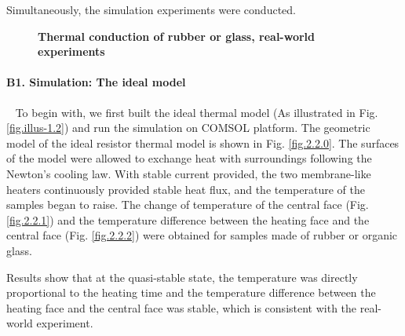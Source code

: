 \documentclass[10pt,a4paper,twocolumn,twoside,UTF8]{article}
\begin{document}
	Simultaneously, the simulation experiments were conducted.
	\begin{figure}[htbp]
		\centering
		\caption{\textbf{Thermal conduction of rubber or glass, real-world experiments}}
		\label{fig.2.1}
	\end{figure}


	\paragraph{B1. Simulation: The ideal model}~
	\newline 
	\indent
	To begin with, we first built the ideal thermal model (As illustrated in Fig. \ref{fig.illus-1.2}) and run the simulation on COMSOL platform.
	The geometric model of the ideal resistor thermal model is shown in Fig. \ref{fig.2.2.0}. 
	The surfaces of the model were allowed to exchange heat with surroundings following the Newton's cooling law.
	With stable current provided, the two membrane-like heaters continuously provided stable heat flux, and the temperature of the samples began to raise. 
	The change of temperature of the central face (Fig. \ref{fig.2.2.1}) and the temperature difference between the heating face and the central face (Fig. \ref{fig.2.2.2}) were obtained for samples made of rubber or organic glass.

	Results show that at the quasi-stable state, the temperature was directly proportional to the heating time and the temperature difference between the heating face and the central face was stable, which is consistent with the real-world experiment.
\end{document}
